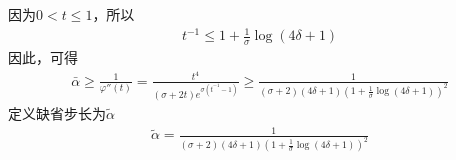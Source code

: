             因为$0<t\leqslant 1$，所以
            \begin{align*}
            t^{-1} \leqslant 1+\frac{1}{\sigma}\log(4\delta +1)
            \end{align*}
            因此，可得
            \begin{align*}
            \bar{\alpha} \geqslant \frac{1}{{\varphi}''(t)}=\frac{t^4}{(\sigma+2t)e^{\sigma(t^{-1}-1)}}\geqslant \frac{1}{(\sigma+2)(4\delta+1)(1+\frac{1}{\sigma}\log(4\delta +1))^2}
            \end{align*}
            定义缺省步长为$\tilde{\alpha}$
            \begin{align*}
            \tilde{\alpha} = \frac{1}{(\sigma+2)(4\delta+1)(1+\frac{1}{\sigma}\log(4\delta +1))^2}
            \end{align*}

